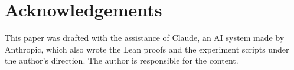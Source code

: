 \documentclass{article}
\theoremstyle{plain}
\theoremstyle{definition}
\theoremstyle{remark}
\begin{document}








\section*{Acknowledgements}
This paper was drafted with the assistance of Claude, an AI system made by
Anthropic, which also wrote the Lean proofs and the experiment scripts under the
author's direction. The author is responsible for the content.




\newpage
\appendix

\end{document}
